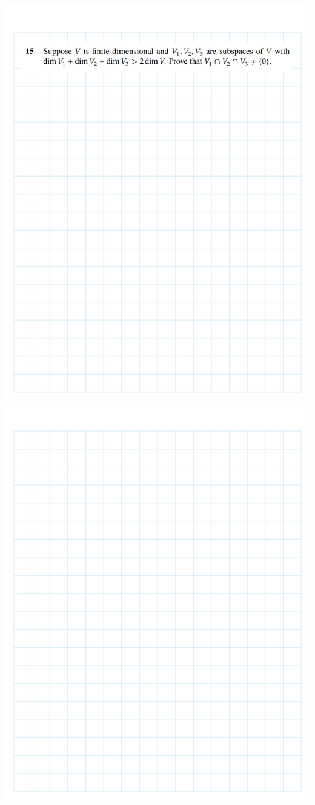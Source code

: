 \documentclass[
]{book}
\theoremstyle{definition}
\theoremstyle{definition}
\theoremstyle{definition}
\theoremstyle{definition}
\theoremstyle{remark}
\begin{document}
\includegraphics{fig/Ex 2B and 2C/Ex 2c (46).png}
\includegraphics{fig/Ex 2B and 2C/Ex 2c (47).png}
\end{document}
